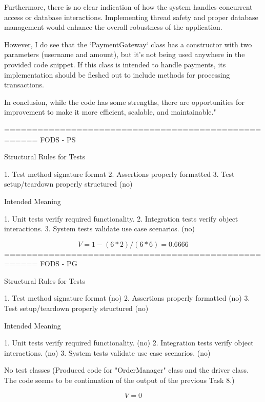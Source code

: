 Furthermore, there is no clear indication of how the system handles concurrent access or database interactions. Implementing thread safety and proper database management would enhance the overall robustness of the application.


However, I do see that the `PaymentGateway` class has a constructor with two parameters (username and amount), but it's not being used anywhere in the provided code snippet. If this class is intended to handle payments, its implementation should be fleshed out to include methods for processing transactions.

In conclusion, while the code has some strengths, there are opportunities for improvement to make it more efficient, scalable, and maintainable."

====================================================
FODS - PS

Structural Rules for Tests

1. Test method signature format
2. Assertions properly formatted
3. Test setup/teardown properly structured (no)

Intended Meaning

1. Unit tests verify required functionality.
2. Integration tests verify object interactions.
3. System tests validate use case scenarios. (no)

$$
V = 1 - (6*2)/(6*6) = 0.6666
$$
====================================================
FODS - PG

Structural Rules for Tests

1. Test method signature format (no)
2. Assertions properly formatted (no)
3. Test setup/teardown properly structured (no)

Intended Meaning

1. Unit tests verify required functionality. (no)
2. Integration tests verify object interactions. (no)
3. System tests validate use case scenarios. (no)

No test classes (Produced code for "OrderManager" class and the driver class. The code seems to be continuation of the output of the previous Task 8.)

$$
V = 0
$$

